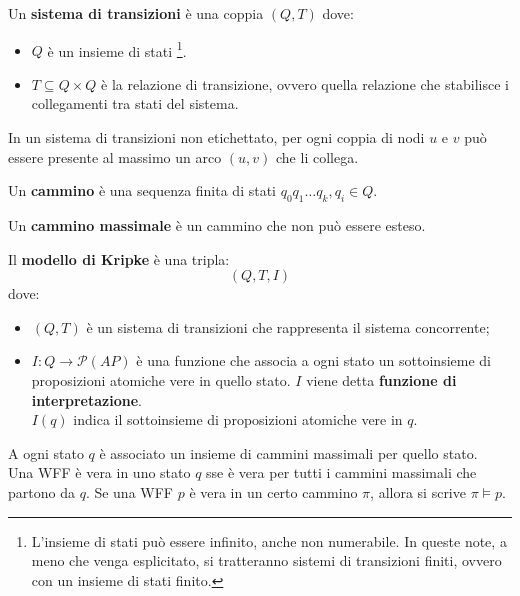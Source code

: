 \begin{defn}
    Un \textbf{sistema di transizioni} è una coppia $(Q, T)$ dove:
    \begin{itemize}
        \item $Q$ è un insieme di stati \footnote[][1cm]{L'insieme di stati
        può essere infinito, anche non numerabile. In queste note, a meno che
        venga esplicitato, si tratteranno sistemi di transizioni finiti,
        ovvero con un insieme di stati finito.}.
        \item $T \subseteq Q \times Q$ è la relazione di transizione, ovvero
        quella relazione che stabilisce i collegamenti tra stati del sistema.
    \end{itemize}
\end{defn}

\begin{rem}
    In un sistema di transizioni non etichettato, per ogni coppia di nodi $u$
    e $v$ può essere presente al massimo un arco $(u, v)$ che li collega.
\end{rem}

\begin{defn}
    Un \textbf{cammino} è una sequenza finita di stati
    $q_0 q_1 \ldots q_k, q_i \in Q$.
\end{defn}

\begin{defn}
    Un \textbf{cammino massimale} è un cammino che non può essere esteso.
\end{defn}

\begin{defn}
    Il \textbf{modello di Kripke} è una tripla:
    \[
        (Q, T, I)
    \]
    dove:
    \begin{itemize}
        \item $(Q, T)$ è un sistema di transizioni che rappresenta il sistema
        concorrente;
        \item $I: Q \rightarrow \mathcal{P}(AP)$ è una funzione che associa a
        ogni stato un sottoinsieme di proposizioni atomiche vere in quello
        stato. $I$ viene detta \textbf{funzione di interpretazione}.\\
        $I(q)$ indica il sottoinsieme di proposizioni atomiche vere in $q$.
    \end{itemize}
\end{defn}

A ogni stato $q$ è associato un insieme di cammini massimali per quello stato.\\
Una WFF è vera in uno stato $q$ sse è vera per tutti i cammini massimali che
partono da $q$. Se una WFF $p$ è vera in un certo cammino $\pi$, allora si
scrive $\pi \vDash p$.

